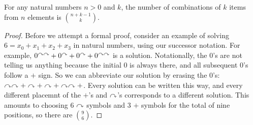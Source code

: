 				\begin{lemma}
					For any natural numbers $n>0$ and $k$, the number of combinations of $k$ items from $n$ elements is $\binom{n+k-1}{k}$.
					
					\begin{proof}
						Before we attempt a formal proof, consider an example of solving $6 = x_0 + x_1 + x_2 + x_3$ in natural numbers, using our successor notation. For example, $0^{\curvearrowright\curvearrowright}+ 0^\curvearrowright + 0^\curvearrowright + 0^{\curvearrowright\curvearrowright}$ is a solution. Notationally, the $0$'s are not telling us anything because the initial $0$ is always there, and all subsequent $0$'s follow a $+$ sign. So we can abbreviate our solution by erasing the $0$'s: $\curvearrowright\curvearrowright\mathord{+}\curvearrowright\mathord{+}\curvearrowright\mathord{+}\curvearrowright\curvearrowright\mathord{+}$.
						Every solution can be written this way, and every different placemnt of the $+$'s and $\curvearrowright$'s corresponds to a different solution.
						This amounts to choosing $6$ $\curvearrowright$ symbols and $3$ $+$ symbols for the total of nine positions, so there are $\binom{9}{6}$.
						

\end{proof}
\end{lemma}
